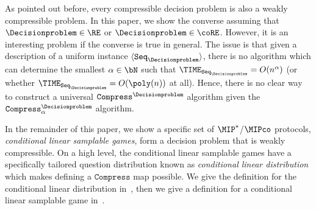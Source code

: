 As pointed out before, every compressible decision problem is also a weakly compressible problem. In this paper, we show the converse assuming that $\Decisionproblem \in \RE$ or $\Decisionproblem \in \coRE$. However, it is an interesting problem if the converse is true in general. The issue is that given a description of a uniform instance $\langle \texttt{Seq}_{\Decisionproblem} \rangle$, there is no algorithm which can determine the smallest $\alpha \in \bN$ such that $\TIME_{\texttt{Seq}_{\Decisionproblem}} = O(n^{\alpha})$ (or whether $\TIME_{\texttt{Seq}_{\Decisionproblem}} = O(\poly(n))$ at all). Hence, there is no clear way to construct a universal $\texttt{Compress}^{\Decisionproblem}$ algorithm given the $\texttt{Compress}^{\Decisionproblem}_{\alpha}$ algorithm. 


In the remainder of this paper, we show a specific set of $\MIP^*$/$\MIPco$ protocols, \textit{conditional linear samplable games}, form a decision problem that is weakly compressible. On a high level, the conditional linear samplable games have a specifically tailored question distribution known as \textit{conditional linear distribution} which makes defining a $\texttt{Compress}$ map possible. We give the definition for the conditional linear distribution in~, then we give a definition for a conditional linear samplable game in~. 


